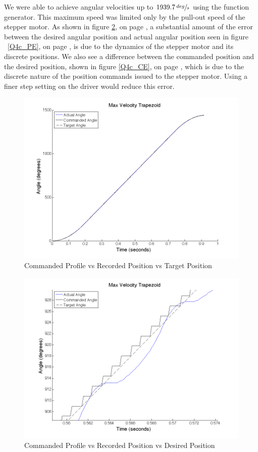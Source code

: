 \documentclass{article}
\theoremstyle{plain}
\theoremstyle{definition}
\theoremstyle{remark}
\begin{document}
We were able to achieve angular velocities up to $1939.7 \, \sfrac{deg}{s}$ using the function generator.  This maximum speed was limited only by the pull-out speed of the stepper motor.  As shown in figure \ref{Q4c_ProfileDetail}, on  page \pageref{Q4c_ProfileDetail}, a substantial amount of the error between the desired angular position and actual angular position seen in figure ~\ref{Q4c_PE}, on page \pageref{Q4c_PE}, is due to the dynamics of the stepper motor and its discrete positions.  We also see a difference between the commanded position and the desired position, shown in figure \ref{Q4c_CE}, on page \pageref{Q4c_CE}, which is due to the discrete nature of the position commands issued to the stepper motor.  Using a finer step setting on the driver would reduce this error.\\

\begin{figure}[hbt]
\begin{center}
\includegraphics[width = 12cm]{4cProfile.png}
\caption{Commanded Profile vs Recorded Position vs Target Position}
\label{Q4c_Profile}
\end{center}
\end{figure}

\begin{figure}[hbt]
\begin{center}
\includegraphics[width = 12cm]{4cProfileDetail1.png}
\caption{Commanded Profile vs Recorded Position vs Desired Position}
\label{Q4c_ProfileDetail}
\end{center}
\end{figure}
\end{document}
